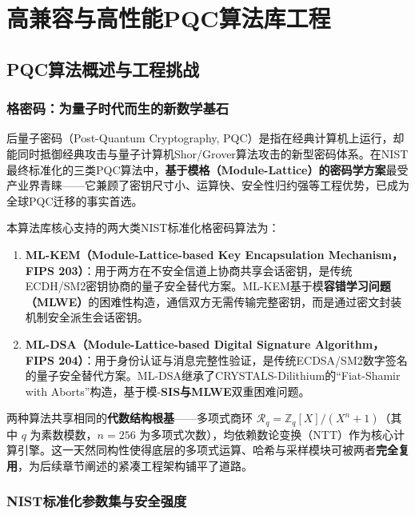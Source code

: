 \chapter{高兼容与高性能PQC算法库工程}

\section{PQC算法概述与工程挑战}

\subsection{格密码：为量子时代而生的新数学基石}

后量子密码（Post-Quantum Cryptography, PQC）是指在经典计算机上运行，却能同时抵御经典攻击与量子计算机Shor/Grover算法攻击的新型密码体系。在NIST最终标准化的三类PQC算法中，\textbf{基于模格（Module-Lattice）的密码学方案}最受产业界青睐——它兼顾了密钥尺寸小、运算快、安全性归约强等工程优势，已成为全球PQC迁移的事实首选。

本算法库核心支持的两大类NIST标准化格密码算法为：

\begin{enumerate}
	\item \textbf{ML-KEM（Module-Lattice-based Key Encapsulation Mechanism，FIPS 203）}：用于两方在不安全信道上协商共享会话密钥，是传统ECDH/SM2密钥协商的量子安全替代方案。ML-KEM基于模\textbf{容错学习问题（MLWE）}的困难性构造，通信双方无需传输完整密钥，而是通过密文封装机制安全派生会话密钥。
	
	\item \textbf{ML-DSA（Module-Lattice-based Digital Signature Algorithm，FIPS 204）}：用于身份认证与消息完整性验证，是传统ECDSA/SM2数字签名的量子安全替代方案。ML-DSA继承了CRYSTALS-Dilithium的``Fiat-Shamir with Aborts''构造，基于模-\textbf{SIS与MLWE}双重困难问题。
\end{enumerate}

两种算法共享相同的\textbf{代数结构根基}——多项式商环 $\mathcal{R}_q = \mathbb{Z}_q[X]/(X^n + 1)$（其中 $q$ 为素数模数，$n=256$ 为多项式次数），均依赖数论变换（NTT）作为核心计算引擎。这一天然同构性使得底层的多项式运算、哈希与采样模块可被两者\textbf{完全复用}，为后续章节阐述的紧凑工程架构铺平了道路。

\subsection{NIST标准化参数集与安全强度}

